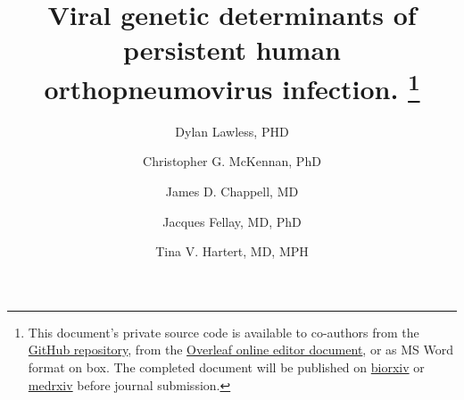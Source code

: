 \documentclass{article}
\begin{document}
\date{} %
\title{\Large \bf Viral genetic determinants of persistent human orthopneumovirus infection.
\footnote{This document's private source code is available to co-authors from the \href{https://github.com/DylanLawless/inspire_manscript}{GitHub repository}, from the \href{https://www.overleaf.com/project/61718a4e077acc3d20ee68f1}{Overleaf online editor document}, or as MS Word format on box. The completed document will be published on 
\href{https://www.biorxiv.org}{biorxiv} or \href{https://www.medrxiv.org}{medrxiv} before journal submission.}
}

\author[1]{\rm Dylan Lawless, PHD}
\author[2]{\rm Christopher G. McKennan, PhD}
\author[3]{\rm James D. Chappell, MD}
\author[1]{\rm Jacques Fellay, MD, PhD }
\author[3,4]{\rm Tina V. Hartert, MD, MPH}




\maketitle

\end{document}
